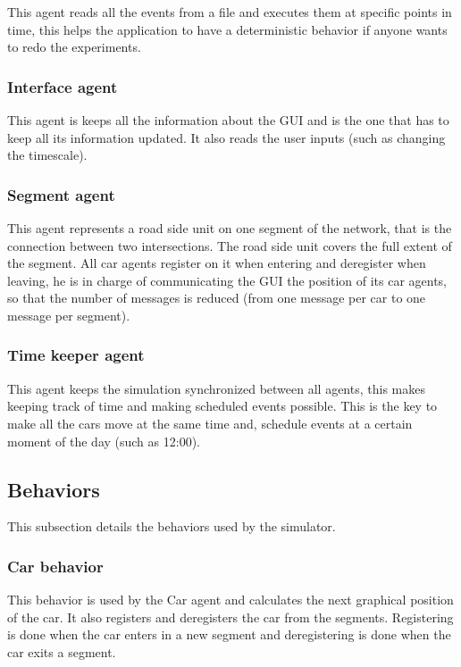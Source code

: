 This agent reads all the events from a file and executes them at specific points in time, this helps the application to have a deterministic behavior if anyone wants to redo the experiments.

\subsubsection{Interface agent}

This agent is keeps all the information about the GUI and is the one that has to keep all its information updated. It also reads the user inputs (such as changing the timescale).

\subsubsection{Segment agent}

This agent represents a road side unit on one segment of the network, that is the connection between two intersections. The road side unit covers the full extent of the segment. All car agents register on it when entering and deregister when leaving, he is in charge of communicating the GUI the position of its car agents, so that the number of messages is reduced (from one message per car to one message per segment).

\subsubsection{Time keeper agent}

This agent keeps the simulation synchronized between all agents, this makes keeping track of time and making scheduled events possible. This is the key to make all the cars move at the same time and, schedule events at a certain moment of the day (such as 12:00).

\subsection{Behaviors}

This subsection details the behaviors used by the simulator.

\subsubsection{Car behavior}

This behavior is used by the Car agent and calculates the next graphical position of the car. It also registers and deregisters the car from the segments. Registering is done when the car enters in a new segment and deregistering is done when the car exits a segment.

